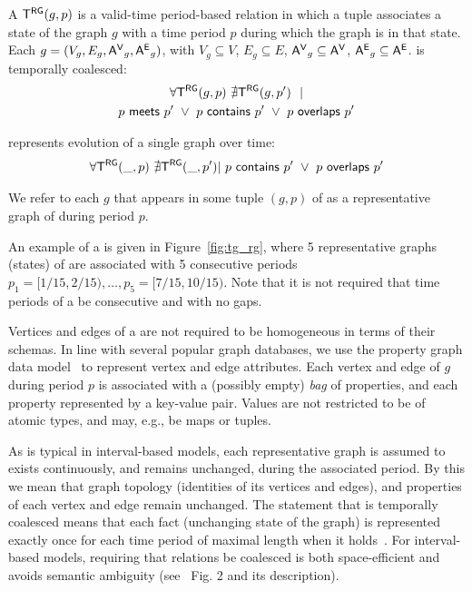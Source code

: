 \begin{definition}[TGraph]
A \tg $\mathsf{T^{RG}}(g, p)$ is a valid-time period-based relation in which a
tuple associates a state of the graph $g$ with a time period $p$
during which the graph is in that state.
%
Each $g = (V_g, E_g, \mathsf{A^{V}}_g, \mathsf{A^{E}}_g)$, with $V_g \subseteq V$, $E_g
\subseteq E$, $\mathsf{A^{V}}_g \subseteq \mathsf{A^{V}}$, $\mathsf{A^{E}}_g \subseteq \mathsf{A^{E}}$.
%
\tgg is temporally coalesced:
\begin{multline}
\forall \mathsf{T^{RG}}(g,p)~\nexists \mathsf{T^{RG}}(g,p')~~| \\
        p~\mathsf{meets}~p'~\lor~p~\mathsf{contains}~p'~\lor~p~\mathsf{overlaps}~p'
\end{multline}

\tgg represents evolution of a single graph over time:
\begin{multline}
\forall \mathsf{T^{RG}}(\_,p)~\nexists \mathsf{T^{RG}}(\_,p')|~p~\mathsf{contains}~p'~\lor~p~\mathsf{overlaps}~p'
\end{multline}

We refer to each $g$ that appears in some tuple $(g,p)$ of \tgg as a
representative graph of \tgg during period $p$.
\label{def:tg_abstract}
\end{definition}

An example of a \tg is given in Figure~\ref{fig:tg_rg}, where 5
representative graphs (states) of  are associated with 5
consecutive periods $p_1=[1/15, 2/15), \ldots, p_5=[7/15, 10/15)$.
    Note that it is not required that time periods of a \tg be
    consecutive and with no gaps.

    Vertices and edges of a \tg are not required to be homogeneous in
    terms of their schemas.  In line with several popular graph
    databases, we use the property graph data model~\cite{GraphDB} to
    represent vertex and edge attributes.  Each vertex and edge of $g$
    during period $p$ is associated with a (possibly empty) {\em bag}
    of properties, and each property represented by a key-value pair.
    Values are not restricted to be of atomic types, and may, e.g., be
    maps or tuples.

As is typical in interval-based models, each representative graph is
assumed to exists continuously, and remains unchanged, during the
associated period.  By this we mean that graph topology (identities of
its vertices and edges), and properties of each vertex and edge remain
unchanged.
%
The statement that \tgg is temporally coalesced means that each fact
(unchanging state of the graph) is represented exactly once for each
time period of maximal length when it
holds~\cite{DBLP:conf/vldb/BohlenSS96}.  For interval-based models,
requiring that relations be coalesced is both space-efficient and
avoids semantic ambiguity (see~\cite{DBLP:reference/db/JensenS09k}
Fig. 2 and its description).

